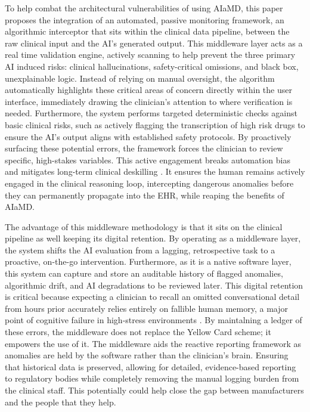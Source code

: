 \documentclass[11pt,a4paper]{article}
\begin{document}
To help combat the architectural vulnerabilities of using AIaMD, this paper proposes the integration of an automated, passive monitoring framework, an algorithmic interceptor that sits within the clinical data pipeline, between the raw clinical input and the AI's generated output. This middleware layer acts as a real time validation engine, actively scanning to help prevent the three primary AI induced risks: clinical hallucinations, safety-critical omissions, and black box, unexplainable logic. Instead of relying on manual oversight, the algorithm automatically highlights these critical areas of concern directly within the user interface, immediately drawing the clinician's attention to where verification is needed. Furthermore, the system performs targeted deterministic checks against basic clinical risks, such as actively flagging the transcription of high risk drugs to ensure the AI's output aligns with established safety protocols. By proactively surfacing these potential errors, the framework forces the clinician to review specific, high-stakes variables. This active engagement breaks automation bias and mitigates long-term clinical deskilling \cite{Goddard2012} . It ensures the human remains actively engaged in the clinical reasoning loop, intercepting dangerous anomalies before they can permanently propagate  into the EHR, while reaping the benefits of AIaMD.

The advantage of this middleware methodology is that it sits on the clinical pipeline as well keeping its digital retention. By operating as a middleware layer, the system shifts the AI evaluation from a lagging, retrospective task to a proactive, on-the-go intervention. Furthermore, as it is a native software layer, this system can capture and store an auditable history of flagged anomalies, algorithmic drift, and AI degradations to be reviewed later. This digital retention is critical because expecting a clinician to recall an omitted conversational detail from hours prior accurately relies entirely on fallible human memory, a major point of cognitive failure in high-stress environments \cite{Goddard2011} . By maintalning a ledger of these errors, the middleware does not replace the Yellow Card scheme; it empowers the use of it. The middleware aids the reactive reporting framework as anomalies are held by the software rather than the clinician's brain. Ensuring that historical data is preserved, allowing for detailed, evidence-based reporting to regulatory bodies while completely removing the manual logging burden from the clinical staff. This potentially could help close the gap between manufacturers and the people that they help.
\end{document}
